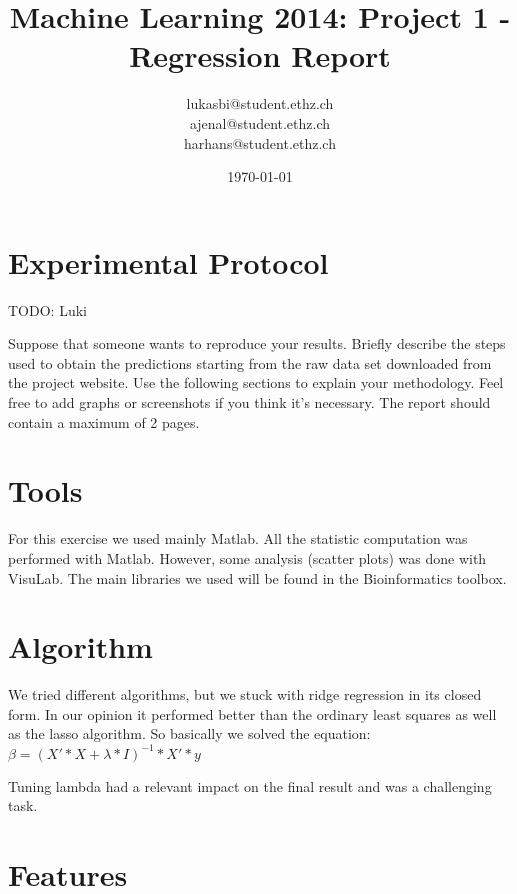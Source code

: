 \documentclass[a4paper, 11pt]{article}
\title{Machine Learning 2014: Project 1 - Regression Report}
\author{lukasbi@student.ethz.ch\\ ajenal@student.ethz.ch\\ harhans@student.ethz.ch\\}
\date{\today}
\begin{document}
\lstset{language=Matlab} 
\maketitle

\section*{Experimental Protocol}

TODO: Luki

Suppose that someone wants to reproduce your results. Briefly describe the steps used to obtain the
predictions starting from the raw data set downloaded from the project website. Use the following
sections to explain your methodology. Feel free to add graphs or screenshots if you think it's
necessary. The report should contain a maximum of 2 pages.

\section{Tools}

For this exercise we used mainly Matlab. All the statistic computation was performed with Matlab. However, some analysis (scatter plots) was done with VisuLab. The main libraries we used will be found in the Bioinformatics toolbox.


\section{Algorithm}

We tried different algorithms, but we stuck with ridge regression in its closed form. In our opinion it performed better than the ordinary least squares as well as the lasso algorithm.
So basically we solved the equation:
\begin{math}
\beta = (X'*X+\lambda*I)^{-1}*X'*y
\end{math}

Tuning lambda had a relevant impact on the final result and was a challenging task.

\section{Features}
\end{document}

